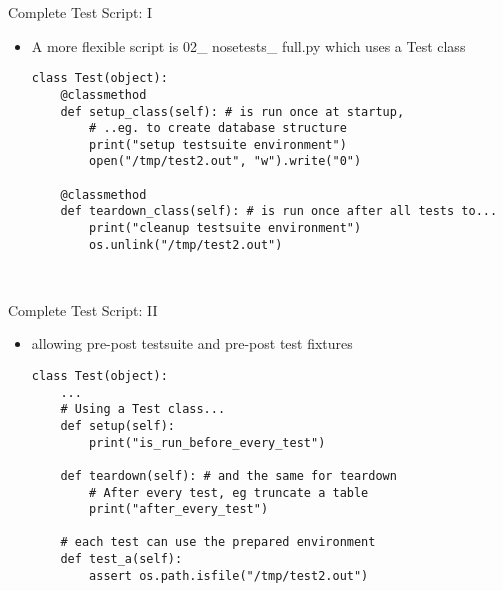 \begin{frame}[fragile]{Complete Test Script: I}
\begin{itemize}
\item A more flexible script is 02\_ nosetests\_ full.py 
which uses a Test class
\begin{verbatim}
class Test(object):
    @classmethod
    def setup_class(self): # is run once at startup, 
        # ..eg. to create database structure
        print("setup testsuite environment")
        open("/tmp/test2.out", "w").write("0")

    @classmethod
    def teardown_class(self): # is run once after all tests to...
        print("cleanup testsuite environment")
        os.unlink("/tmp/test2.out")

 
\end{verbatim} 
\end{itemize}
\end{frame}

\begin{frame}[fragile]{Complete Test Script: II}
\begin{itemize}
\item allowing pre-post testsuite and pre-post test fixtures
\begin{verbatim}
class Test(object):
    ...
    # Using a Test class...
    def setup(self): 
        print("is_run_before_every_test")

    def teardown(self): # and the same for teardown
        # After every test, eg truncate a table
        print("after_every_test")

    # each test can use the prepared environment
    def test_a(self): 
        assert os.path.isfile("/tmp/test2.out")
 
\end{verbatim}
\end{itemize}
\end{frame}
